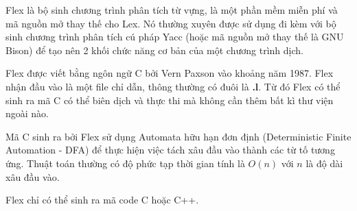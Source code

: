 \documentclass[../report.tex]{subfiles}
\begin{document}
Flex là bộ sinh chương trình phân tích từ vựng, 
là một phần mềm miễn phí và mã nguồn mở thay thế cho Lex. \cite{flex-wiki}
Nó thường xuyên được sử dụng đi kèm với bộ sinh chương trình phân 
tích cú pháp Yacc (hoặc mã nguồn mở thay thế là GNU Bison) để tạo nên 2 khối 
chức năng cơ bản của một chương trình dịch. 

Flex được viết bằng ngôn ngữ C bởi Vern Paxson vào khoảng năm 1987. 
Flex nhận đầu vào là một file chỉ dẫn, thông thường có đuôi là \textbf{.l}.
Từ đó Flex có thể sinh ra mã C có thể biên dịch và thực thi mà 
không cần thêm bất kì thư viện ngoài nào. 

Mã C sinh ra bởi Flex sử dụng Automata hữu hạn đơn định (Deterministic Finite Automation - DFA) 
để thực hiện việc tách xâu đầu vào thành các từ tố tương ứng. 
Thuật toán thường có độ phức tạp thời gian tính là $O(n)$ với $n$ là độ dài 
xâu đầu vào. 

Flex chỉ có thể sinh ra mã code C hoặc C++. 
\end{document}
